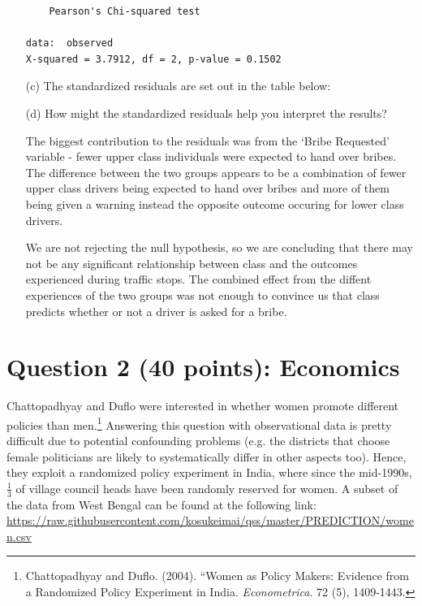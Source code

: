 \documentclass[12pt,letterpaper]{article}
\begin{document}
\begin{enumerate}
\begin{verbatim}
	Pearson's Chi-squared test

data:  observed
X-squared = 3.7912, df = 2, p-value = 0.1502
\end{verbatim}
	\newpage
	\item [(c)] The standardized residuals are set out in the table below:
	\vspace{1cm}

	
	
	\item [(d)] How might the standardized residuals help you interpret the results?  

    The biggest contribution to the residuals was from the `Bribe Requested' variable - 
    fewer upper class individuals were expected to hand over bribes.  The difference 
    between the two groups appears to be a combination of fewer upper class drivers
    being expected to hand over bribes and more of them being given a warning instead 
    the opposite outcome occuring for lower class drivers.

    We are not rejecting the null hypothesis, so we are concluding that there may
    not be any significant relationship between class and the outcomes experienced 
    during traffic stops.  The combined effect from the diffent experiences of the two 
    groups was not enough to convince us that class predicts whether or not a driver
    is asked for a bribe.
    
    
  
\end{enumerate}

\newpage

\section*{Question 2 (40 points): Economics}
Chattopadhyay and Duflo were interested in whether women promote different policies than men.\footnote{Chattopadhyay and Duflo. (2004). ``Women as Policy Makers: Evidence from a Randomized Policy Experiment in India. \textit{Econometrica}. 72 (5), 1409-1443.} Answering this question with observational data is pretty difficult due to potential confounding problems (e.g. the districts that choose female politicians are likely to systematically differ in other aspects too). Hence, they exploit a randomized policy experiment in India, where since the mid-1990s, $\frac{1}{3}$ of village council heads have been randomly reserved for women. A subset of the data from West Bengal can be found at the following link: \url{https://raw.githubusercontent.com/kosukeimai/qss/master/PREDICTION/women.csv}\\
\end{document}
